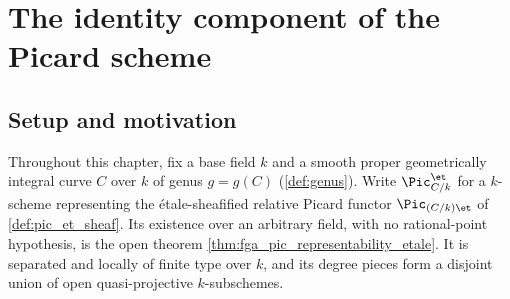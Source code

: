 \chapter{The identity component of the Picard scheme}
\label{chap:Picard_IdentityComponent}
\providecommand{\connComp}{\operatorname{Comp}}

%


\section{Setup and motivation}
\label{sec:pic0_setup}

Throughout this chapter, fix a base field \(k\) and a smooth proper
geometrically integral curve \(C\) over \(k\) of genus \(g = g(C)\)
(\cref{def:genus}). Write \(\Pic^{\et}_{C/k}\) for a \(k\)-scheme
representing the \'etale-sheafified relative Picard functor
\(\Pic_{(C/k)\et}\) of \cref{def:pic_et_sheaf}. Its existence over an
arbitrary field, with no rational-point hypothesis, is the open theorem
\cref{thm:fga_pic_representability_etale}. It is separated and locally of
finite type over \(k\), and its degree pieces form a disjoint union of open
quasi-projective \(k\)-subschemes.

